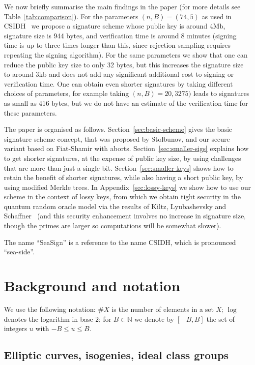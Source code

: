 \documentclass{llncs}
\newcommand{\N}{\mathbb{N}}
\begin{document}
We now briefly summarise the main findings in the paper (for more details see Table~\ref{tab:comparison}).
For the parameters $(n,B) = (74,5)$ as used in CSIDH~\cite{CLMPR18} we propose a signature scheme whose public key is around 4Mb, signature size is 944 bytes, and verification time is around 8 minutes (signing time is up to three times longer than this, since rejection sampling requires repeating the signing algorithm). For the same parameters we show that one can reduce the public key size to only 32 bytes, but this increases the signature size to around 3kb and does not add any significant additional cost to signing or verification time.
One can obtain even shorter signatures by taking different choices of parameters, for example taking $(n,B) = 20,3275)$ leads to signatures as small as 416 bytes, but we do not have an estimate of the verification time for these parameters.


The paper is organised as follows.
Section~\ref{sec:basic-scheme} gives the basic signature scheme concept, that was proposed by Stolbunov, and our secure variant based on Fiat-Shamir with aborts.
Section~\ref{sec:smaller-sigs} explains how to get shorter signatures, at the expense of public key size, by using challenges that are more than just a single bit.
Section~\ref{sec:smaller-keys} shows how to retain the benefit of shorter signatures, while also having a short public key, by using modified Merkle trees.
In Appendix~\ref{sec:lossy-keys} we show how to use our scheme in the context of lossy keys, from which we obtain tight security in the quantum random oracle model via the results of Kiltz, Lyubashevsky and Schaffner~\cite{KLS18} (and this security enhancement involves no increase in signature size, though the primes are larger so computations will be somewhat slower).


The name ``SeaSign'' is a reference to the name CSIDH, which is pronounced ``sea-side''.




\section{Background and notation}


We use the following notation: 
$\#X$ is the number of elements in a set $X$;
$\log$ denotes the logarithm in base $2$;
for $B \in \N$ we denote by $[-B,B]$ the set of integers $u$ with $-B \le u \le B$.


\subsection{Elliptic curves, isogenies, ideal class groups}
\end{document}

